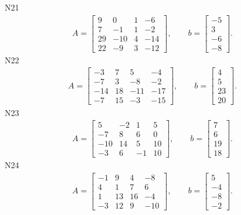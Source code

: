 \documentclass[11pt]{report}
\begin{document}
N21
\begin{align*}
 A = \left[\begin{matrix}9 & 0 & 1 & -6\\7 & -1 & 1 & -2\\29 & -10 & 4 & -14\\22 & -9 & 3 & -12\end{matrix}\right],
\qquad b = \left[\begin{matrix}-5\\3\\-6\\-8\end{matrix}\right]. 
 \end{align*}
N22
\begin{align*}
 A = \left[\begin{matrix}-3 & 7 & 5 & -4\\-7 & 3 & -8 & -2\\-14 & 18 & -11 & -17\\-7 & 15 & -3 & -15\end{matrix}\right],
\qquad b = \left[\begin{matrix}4\\5\\23\\20\end{matrix}\right]. 
 \end{align*}
N23
\begin{align*}
 A = \left[\begin{matrix}5 & -2 & 1 & 5\\-7 & 8 & 6 & 0\\-10 & 14 & 5 & 10\\-3 & 6 & -1 & 10\end{matrix}\right],
\qquad b = \left[\begin{matrix}7\\6\\19\\18\end{matrix}\right]. 
 \end{align*}
N24
\begin{align*}
 A = \left[\begin{matrix}-1 & 9 & 4 & -8\\4 & 1 & 7 & 6\\1 & 13 & 16 & -4\\-3 & 12 & 9 & -10\end{matrix}\right],
\qquad b = \left[\begin{matrix}5\\-4\\-8\\-2\end{matrix}\right]. 
 \end{align*}
\end{document}
